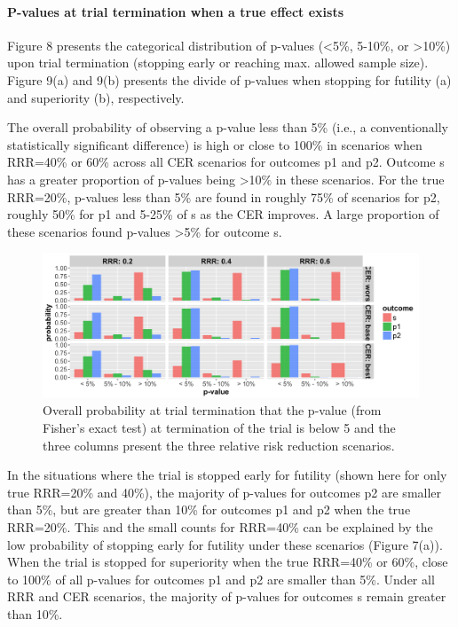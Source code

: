 \documentclass[]{article}
\let\oldparagraph\paragraph
\renewcommand{\paragraph}[1]{\oldparagraph{#1}\mbox{}}
\begin{document}
\hypertarget{p-values-at-trial-termination-when-a-true-effect-exists}{%
\paragraph{P-values at trial termination when a true effect
exists}\label{p-values-at-trial-termination-when-a-true-effect-exists}}

Figure 8 presents the categorical distribution of p-values
(\textless{}5\%, 5-10\%, or \textgreater{}10\%) upon trial termination
(stopping early or reaching max. allowed sample size). Figure 9(a) and
9(b) presents the divide of p-values when stopping for futility (a) and
superiority (b), respectively.

The overall probability of observing a p-value less than 5\% (i.e., a
conventionally statistically significant difference) is high or close to
100\% in scenarios when RRR=40\% or 60\% across all CER scenarios for
outcomes p1 and p2. Outcome s has a greater proportion of p-values being
\textgreater{}10\% in these scenarios. For the true RRR=20\%, p-values
less than 5\% are found in roughly 75\% of scenarios for p2, roughly
50\% for p1 and 5-25\% of s as the CER improves. A large proportion of
these scenarios found p-values \textgreater{}5\% for outcome s.

\begin{figure}
  \caption{Overall probability at trial termination that the p-value (from Fisher’s exact test) at termination of the
  trial is below 5%
  and the three columns present the three relative risk reduction scenarios.}
  \includegraphics{../plots/stop_p1_new/pvalue_sim_05_stopp1_new.png}
\end{figure}

In the situations where the trial is stopped early for futility (shown
here for only true RRR=20\% and 40\%), the majority of p-values for
outcomes p2 are smaller than 5\%, but are greater than 10\% for outcomes
p1 and p2 when the true RRR=20\%. This and the small counts for RRR=40\%
can be explained by the low probability of stopping early for futility
under these scenarios (Figure 7(a)). When the trial is stopped for
superiority when the true RRR=40\% or 60\%, close to 100\% of all
p-values for outcomes p1 and p2 are smaller than 5\%. Under all RRR and
CER scenarios, the majority of p-values for outcomes s remain greater
than 10\%.
\end{document}
